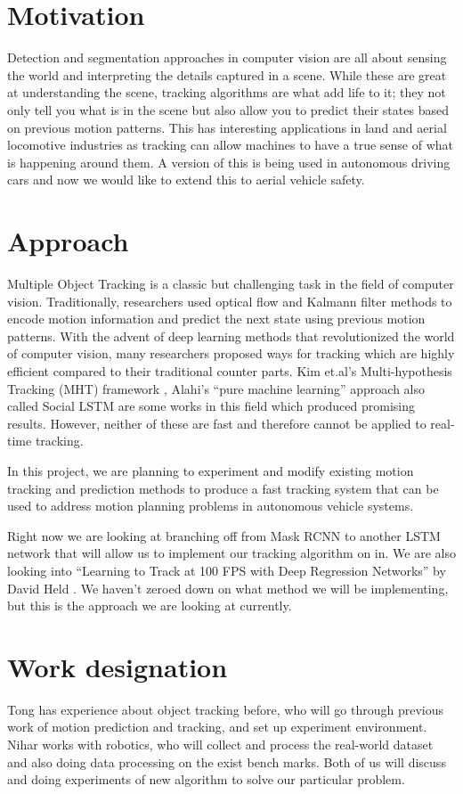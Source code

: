 \documentclass{article}
\begin{document}
\section{Motivation}
Detection and segmentation approaches in computer vision are all about sensing the world and interpreting the details captured in a scene. While these are great at understanding the scene, tracking algorithms are what add life to it; they not only tell you what is in the scene but also allow you to predict their states based on previous motion patterns.  This has interesting applications in land and aerial locomotive industries as tracking can allow machines to have a true sense of what is happening around them. A version of this is being used in autonomous driving cars and now we would like to extend this to aerial vehicle safety. 
\section{Approach}
Multiple Object Tracking is a classic but challenging task in the field of computer vision. Traditionally, researchers used optical flow and Kalmann filter methods to encode motion information and predict the next state using previous motion patterns. With the advent of deep learning methods that revolutionized the world of computer vision, many researchers proposed ways for tracking which are highly efficient compared to their traditional counter parts. Kim et.al’s Multi-hypothesis Tracking (MHT) framework \cite{kim2015multiple} , Alahi’s “pure machine learning” approach also called Social LSTM  \cite{Alahi_2016_CVPR} are some works in this field which produced promising results. However, neither of these are fast and therefore cannot be applied to real-time tracking. 

In this project, we are planning to experiment and modify existing motion tracking and prediction methods to produce a fast tracking system that can be used to address motion planning problems in autonomous vehicle systems. 

Right now we are looking at branching off from Mask RCNN to another LSTM network that will allow us to implement our tracking algorithm on in. We are also looking into “Learning to Track at 100 FPS with Deep Regression Networks” by David Held \cite{held2016learning}. We haven’t zeroed down on what method we will be implementing, but this is the approach we are looking at currently.


\section{Work designation}
Tong has experience about object tracking before, who will go through previous work of motion prediction and tracking, and set up experiment environment. Nihar works with robotics, who will collect and process the real-world dataset and also doing data processing on the exist bench marks. Both of us will discuss and doing experiments of new algorithm to solve our particular problem.
\small{
	
	
} 
\end{document}

